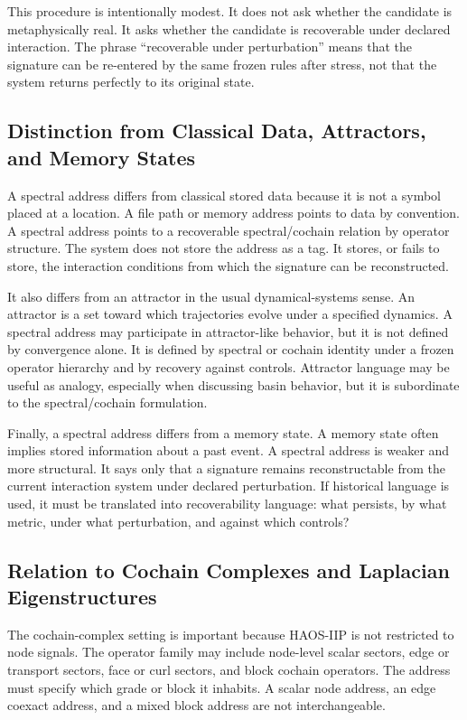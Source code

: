 \documentclass[11pt]{article}
\begin{document}
This procedure is intentionally modest. It does not ask whether the candidate is metaphysically real. It asks whether the candidate is recoverable under declared interaction. The phrase ``recoverable under perturbation'' means that the signature can be re-entered by the same frozen rules after stress, not that the system returns perfectly to its original state.

\subsection{Distinction from Classical Data, Attractors, and Memory States}

A spectral address differs from classical stored data because it is not a symbol placed at a location. A file path or memory address points to data by convention. A spectral address points to a recoverable spectral/cochain relation by operator structure. The system does not store the address as a tag. It stores, or fails to store, the interaction conditions from which the signature can be reconstructed.

It also differs from an attractor in the usual dynamical-systems sense. An attractor is a set toward which trajectories evolve under a specified dynamics. A spectral address may participate in attractor-like behavior, but it is not defined by convergence alone. It is defined by spectral or cochain identity under a frozen operator hierarchy and by recovery against controls. Attractor language may be useful as analogy, especially when discussing basin behavior, but it is subordinate to the spectral/cochain formulation.

Finally, a spectral address differs from a memory state. A memory state often implies stored information about a past event. A spectral address is weaker and more structural. It says only that a signature remains reconstructable from the current interaction system under declared perturbation. If historical language is used, it must be translated into recoverability language: what persists, by what metric, under what perturbation, and against which controls?

\subsection{Relation to Cochain Complexes and Laplacian Eigenstructures}

The cochain-complex setting is important because HAOS-IIP is not restricted to node signals. The operator family may include node-level scalar sectors, edge or transport sectors, face or curl sectors, and block cochain operators. The address must specify which grade or block it inhabits. A scalar node address, an edge coexact address, and a mixed block address are not interchangeable.
\end{document}

